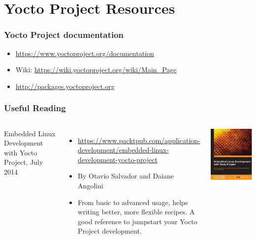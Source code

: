 \section{Yocto Project Resources}

\begin{frame}
  \frametitle{Yocto Project documentation}
  \begin{itemize}
  \item \url{https://www.yoctoproject.org/documentation}
  \item Wiki: \url{https://wiki.yoctoproject.org/wiki/Main_Page}
  \item \url{http://packages.yoctoproject.org}
  \end{itemize}
\end{frame}

\begin{frame}
  \frametitle{Useful Reading}
  \begin{columns}
    Embedded Linux Development with Yocto Project, July 2014
    \begin{itemize}
    \item \url{https://www.packtpub.com/application-development/embedded-linux-development-yocto-project}
    \item By Otavio Salvador and Daiane Angolini
    \item From basic to advanced usage, helps writing better, more
      flexible recipes. A good reference to jumpstart your Yocto
      Project development.
    \end{itemize}
    \includegraphics[width=\textwidth]{slides/yocto-resources/ELDYP.jpg}
  \end{columns}
\end{frame}
